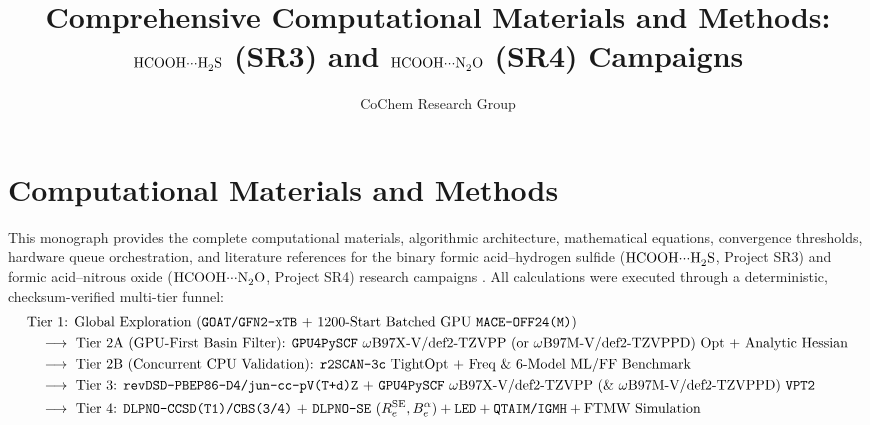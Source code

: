 \documentclass[journal=jpclcd,manuscript=article]{achemso}
\author{CoChem Research Group}
\affiliation{CoChem Computational Chemistry and Rotational Spectroscopy Campaign}
\title{Comprehensive Computational Materials and Methods: $\ce{HCOOH\bond{...}H2S}$ (SR3) and $\ce{HCOOH\bond{...}N2O}$ (SR4) Campaigns}
\begin{document}
\section{Computational Materials and Methods}

This monograph provides the complete computational materials, algorithmic architecture, mathematical equations, convergence thresholds, hardware queue orchestration, and literature references for the binary formic acid--hydrogen sulfide ($\ce{HCOOH\bond{...}H2S}$, Project SR3) and formic acid--nitrous oxide ($\ce{HCOOH\bond{...}N2O}$, Project SR4) research campaigns \cite{Neese2020, Neese2022, Sun2018, Sun2020, Wu2024, Li2024, Larsen2017, Lu2012, Lu2024}. All calculations were executed through a deterministic, checksum-verified multi-tier funnel:
\begin{align*}
  &\text{Tier 1: Global Exploration (\texttt{GOAT/GFN2-xTB} + 1200-Start Batched GPU \texttt{MACE-OFF24(M)})} \\
  &\quad\longrightarrow\ \text{Tier 2A (GPU-First Basin Filter): \texttt{GPU4PySCF} }\omega\text{B97X-V/def2-TZVPP (or }\omega\text{B97M-V/def2-TZVPPD) Opt + Analytic Hessian} \\
  &\quad\longrightarrow\ \text{Tier 2B (Concurrent CPU Validation): \texttt{r2SCAN-3c} TightOpt + Freq \& 6-Model ML/FF Benchmark} \\
  &\quad\longrightarrow\ \text{Tier 3: \texttt{revDSD-PBEP86-D4/jun-cc-pV(T+d)Z} + \texttt{GPU4PySCF} }\omega\text{B97X-V/def2-TZVPP (\& }\omega\text{B97M-V/def2-TZVPPD) \texttt{VPT2}} \\
  &\quad\longrightarrow\ \text{Tier 4: \texttt{DLPNO-CCSD(T1)/CBS(3/4)} + \texttt{DLPNO-SE} }(R_e^{\mathrm{SE}}, B_e^\alpha) + \texttt{LED} + \texttt{QTAIM/IGMH} + \text{FTMW Simulation}
\end{align*}
\end{document}

